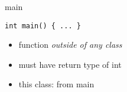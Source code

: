 
\begin{frame}[fragile,label=main]{main}
\lstset{language=C++}
\begin{lstlisting}
int main() { ... }
\end{lstlisting}
\begin{itemize}
\item function \textit{outside of any class}
\item must have return type of int
\item this class:  from main
\end{itemize}
\end{frame}
